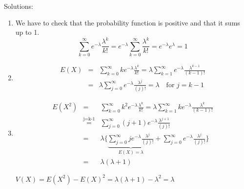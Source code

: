 \documentclass[12pt,thmsa]{article}\usepackage[]{graphicx}\usepackage[]{color}
\begin{document}
\noindent Solutions:
\begin{enumerate}
  \item We have to check that the probability function is positive and that it sums up to 1.
  \begin{equation*}
  \sum_{k=0}^{\infty} e^{-\lambda} \frac{\lambda^{k}}{k!}=e^{-\lambda} \sum_{k=0}^{\infty} \frac{\lambda^{k}}{k!}=e^{-\lambda} e^{\lambda}=1
  \end{equation*}
  \item \begin{eqnarray*}
    E(X) &=& \sum_{k=0}^{\infty} k e^{-\lambda} \frac{\lambda^{k}}{k!} = \lambda \sum_{k=1}^{\infty}  e^{-\lambda}  \frac{\lambda^{k-1}}{(k-1)!} \\
    &=& \lambda \sum_{j=0}^{\infty}  e^{-\lambda}  \frac{\lambda^{j}}{(j)!} = \lambda  \quad \text{for } j=k-1
  \end{eqnarray*}

 \item  \begin{eqnarray*}
E(X^2) &=& \sum_{k=0}^{\infty} k^2 e^{-\lambda} \frac{\lambda^{k}}{k!} = \lambda \sum_{k=1}^{\infty} k e^{-\lambda} \frac{\lambda^{k}}{(k-1)!} \\
& \overset{\text{j=k-1}}{=} & \sum_{j=0}^{\infty} (j+1) e^{-\lambda}  \frac{\lambda^{j+1}}{(j)!} \\
&=& \lambda \{ \underbrace{\sum_{j=0}^{\infty} j e^{-\lambda}  \frac{\lambda^{j}}{(j)!}}_{E(X)=\lambda} + \sum_{j=0}^{\infty}  e^{-\lambda}  \frac{\lambda^{j}}{(j)!}\} \\
&=& \lambda (\lambda+1)
\end{eqnarray*}

  $ V(X) = E(X^2) - E(X)^2 = \lambda ( \lambda +1) - \lambda ^2 =\lambda $\\


\end{enumerate}
\end{document}
